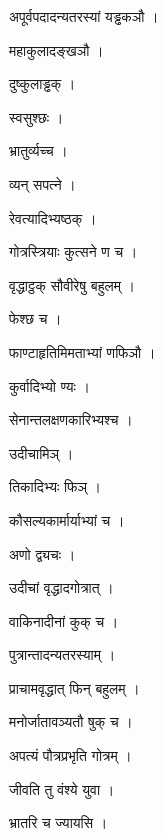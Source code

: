 \documentclass[10pt, openany]{book}
\begin{document}
\noindent अपूर्वपदादन्यतरस्यां यड्ढकञौ ।

\noindent महाकुलादङ्खञौ ।

\noindent दुष्कुलाड्ढक् ।

\noindent स्वसुश्छः ।

\noindent भ्रातुर्व्यच्च ।

\noindent व्यन् सपत्ने ।

\noindent रेवत्यादिभ्यष्ठक् ।

\noindent गोत्रस्त्रियाः कुत्सने ण च ।

\noindent वृद्धाट्ठक् सौवीरेषु बहुलम् ।

\noindent फेश्छ च ।

\noindent फाण्टाहृतिमिमताभ्यां णफिञौ ।

\noindent कुर्वादिभ्यो ण्यः ।

\noindent सेनान्तलक्षणकारिभ्यश्च ।

\noindent उदीचामिञ् ।

\noindent तिकादिभ्यः फिञ् ।

\noindent कौसल्यकार्मार्याभ्यां च ।

\noindent अणो द्व्यचः ।

\noindent उदीचां वृद्धादगोत्रात् ।

\noindent वाकिनादीनां कुक् च ।

\noindent पुत्रान्तादन्यतरस्याम् ।

\noindent प्राचामवृद्धात् फिन् बहुलम् ।

\noindent मनोर्जातावञ्यतौ षुक् च ।

\noindent अपत्यं पौत्रप्रभृति गोत्रम् ।

\noindent जीवति तु वंश्ये युवा ।

\noindent भ्रातरि च ज्यायसि ।
\end{document}
